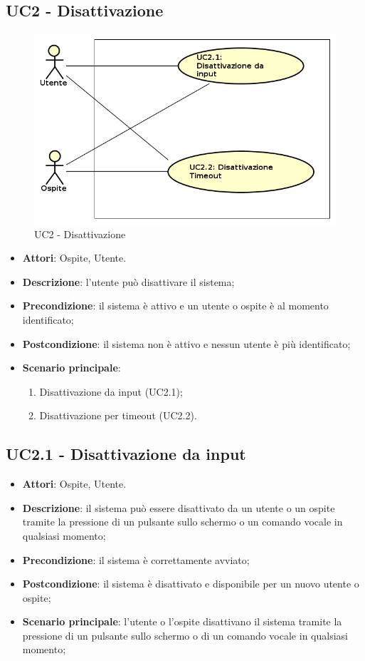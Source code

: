 \documentclass[../AnalisiDeiRequisiti_v4.0.0.tex]{subfiles}
\begin{document}
\subsection{UC2 - Disattivazione} 
\label{sssec:UC2}
\begin{figure}[!h]
	\centering
	\includegraphics[width=\textwidth]{UseCases/UC2_Disattivazione/UC2_Disattivazione.png}
	\caption{UC2 - Disattivazione}
\end{figure}
\begin{itemize} 
\item \textbf{Attori}: Ospite, Utente.
\item \textbf{Descrizione}: l'utente può disattivare il sistema;
\item \textbf{Precondizione}: il sistema è attivo e un utente o ospite è al momento identificato;
\item \textbf{Postcondizione}: il sistema non è attivo e nessun utente è più identificato;
\item \textbf{Scenario principale}: \begin{enumerate}\item Disattivazione da input (UC2.1);\item Disattivazione per timeout (UC2.2). 
 \end{enumerate}
\end{itemize} 
\subsection{UC2.1 - Disattivazione da input} 
\label{sssec:UC2.1} 
\begin{itemize} 
\item \textbf{Attori}: Ospite, Utente.
\item \textbf{Descrizione}: il sistema può essere disattivato da un utente o un ospite tramite la pressione di un pulsante sullo schermo o un comando vocale in qualsiasi momento;
\item \textbf{Precondizione}: il sistema è correttamente avviato;
\item \textbf{Postcondizione}: il sistema è disattivato e disponibile per un nuovo utente o ospite;
\item \textbf{Scenario principale}: l'utente o l'ospite disattivano il sistema tramite la pressione di un pulsante sullo schermo o di un comando vocale in qualsiasi momento;
\end{itemize} 
\end{document}
